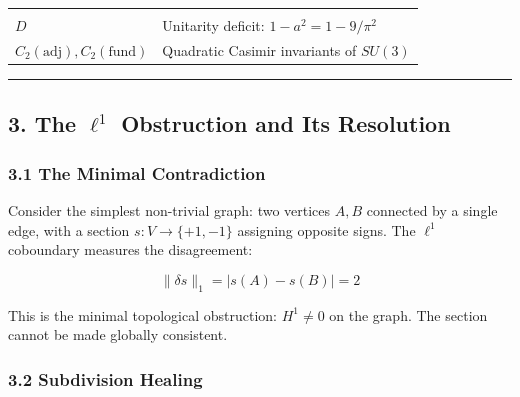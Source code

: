 \documentclass[
]{article}
\begin{document}
\begin{longtable}[]{@{}ll@{}}
\begin{minipage}[t]{0.54\columnwidth}
\end{minipage}\tabularnewline
\begin{minipage}[t]{0.40\columnwidth}\raggedright
\(D\)\strut
\end{minipage} & \begin{minipage}[t]{0.54\columnwidth}\raggedright
Unitarity deficit: \(1 - a^2 = 1 - 9/\pi^2\)\strut
\end{minipage}\tabularnewline
\begin{minipage}[t]{0.40\columnwidth}\raggedright
\(C_2(\mathrm{adj}), C_2(\mathrm{fund})\)\strut
\end{minipage} & \begin{minipage}[t]{0.54\columnwidth}\raggedright
Quadratic Casimir invariants of \(SU(3)\)\strut
\end{minipage}\tabularnewline
\bottomrule
\end{longtable}

\begin{center}\rule{0.5\linewidth}{0.5pt}\end{center}

\hypertarget{the-ell1-obstruction-and-its-resolution}{%
\subsection{\texorpdfstring{3. The \(\ell^1\) Obstruction and Its
Resolution}{3. The \textbackslash ell\^{}1 Obstruction and Its Resolution}}\label{the-ell1-obstruction-and-its-resolution}}

\hypertarget{the-minimal-contradiction}{%
\subsubsection{3.1 The Minimal
Contradiction}\label{the-minimal-contradiction}}

Consider the simplest non-trivial graph: two vertices \(A, B\) connected
by a single edge, with a section \(s: V \to \{+1, -1\}\) assigning
opposite signs. The \(\ell^1\) coboundary measures the disagreement:

\[\|\delta s\|_1 = |s(A) - s(B)| = 2\]

This is the minimal topological obstruction: \(H^1 \neq 0\) on the
graph. The section cannot be made globally consistent.

\hypertarget{subdivision-healing}{%
\subsubsection{3.2 Subdivision Healing}\label{subdivision-healing}}
\end{document}
